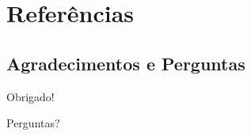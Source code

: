 \documentclass{UnBeamer}
\begin{document}
\section{Referências}

\begin{frame}[allowframebreaks]
    \printbibliography[heading=none]
\end{frame}

\subsection{Agradecimentos e Perguntas}
\begin{frame}
    \centering\Huge
    \begin{block}{}
        \centering
        Obrigado!\\[2ex]
    \end{block}
    \Large {\color{greenUnB} Perguntas?}
\end{frame}
\end{document}
